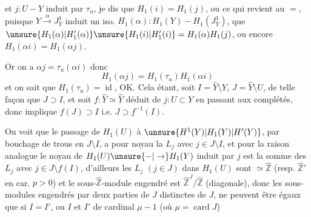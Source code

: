 et $j:U-Y$ induit par $\tau_u$, je dis que $H_1(i)=H_1(j)$, ou ce qui revient au $=$, puisque $Y\xrightarrow{\alpha}J_Y^1$ induit un iso. $H_1(\alpha):H_1(Y)-H_1(J_Y^1)$, que $\unsure{H_1(\alpha)|H'_1(\alpha)}\unsure{H_1(i)|H'_1(i)}=H_1(\alpha)H_1(j)$, ou encore $H_1(\alpha i)=H_1(\alpha j)$.

Or on a $\alpha j=\tau_u(\alpha i)$ donc 
\[
H_1(\alpha j)=H_1(\tau_u)H_1(\alpha i)
\]
et on sait que $H_1(\tau_u)=\operatorname{id}$, OK. Cela étant, soit $I=\widehat Y\setminus Y$, $J=\widehat Y\setminus U$, de telle façon que $J\supset I$, et soit $f:\widehat Y\simeq\widehat Y$ déduit de $j:U\subset Y$ en passant aux complétés, donc   implique $f(J)\supset I$ i.e. $J\supset f^{-1}(I)$.

On voit que le passage de $H_1(U)$ à $\unsure{H^1(Y)|H_1(Y)|H'(Y)}$, par bouchage de trous en $J\setminus I$, a pour noyau la  $L_j$ avec $j\in J\setminus I$, et pour la raison analogue le noyau de $H_1(U)\unsure{-|\to}H_1(Y)$ induit par $j$ est la somme des $L_j$ avec $j\in J\setminus f(I)$, d'ailleurs les $L_j$ $(j\in J)$ dans $H_1(U)$ sont $\simeq\widehat{\mathbb Z}$ (resp. $\widehat{\mathbb Z}'$ en car. $p>0$) et le sous-$\widehat{\mathbb Z}$-module engendré est $\widehat{\mathbb Z}^{J}/\widehat{\mathbb Z}$ (diagonale), donc  les sous-modules engendrés par deux parties  de $J$ distinctes de $J$, ne peuvent être égaux que si $I=I'$, ou $I$ et $I'$ de cardinal $\mu-1$ (où $\mu=\operatorname{card}J$)
